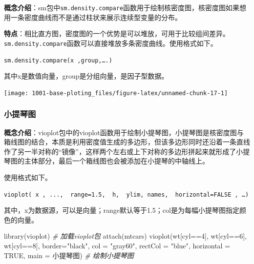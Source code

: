 \documentclass[
]{book}
\newenvironment{Shaded}{\begin{snugshade}}{\end{snugshade}}
\newcommand{\AttributeTok}[1]{\textcolor[rgb]{0.77,0.63,0.00}{#1}}
\newcommand{\CommentTok}[1]{\textcolor[rgb]{0.56,0.35,0.01}{\textit{#1}}}
\newcommand{\ConstantTok}[1]{\textcolor[rgb]{0.00,0.00,0.00}{#1}}
\newcommand{\DecValTok}[1]{\textcolor[rgb]{0.00,0.00,0.81}{#1}}
\newcommand{\FunctionTok}[1]{\textcolor[rgb]{0.00,0.00,0.00}{#1}}
\newcommand{\NormalTok}[1]{#1}
\newcommand{\SpecialCharTok}[1]{\textcolor[rgb]{0.00,0.00,0.00}{#1}}
\newcommand{\StringTok}[1]{\textcolor[rgb]{0.31,0.60,0.02}{#1}}
\begin{document}
\textbf{概念介绍}：sm包中\texttt{sm.density.compare}函数用于绘制核密度图，核密度图如果想用一条密度曲线而不是通过柱状来展示连续型变量的分布。

\textbf{特点}：相比直方图，密度图的一个优势是可以堆放，可用于比较组间差异。\texttt{sm.density.compare}函数可以直接堆放多条密度曲线。使用格式如下。

\texttt{sm.density.compare(x\ ,group,….)}

其中x是数值向量，group是分组向量，是因子型数据。

\begin{Shaded}
\end{Shaded}

\begin{center}\texttt{[image: 1001-base-ploting\_files/figure-latex/unnamed-chunk-17-1]} \end{center}

\hypertarget{ux5c0fux63d0ux7434ux56fe}{%
\subsubsection{小提琴图}\label{ux5c0fux63d0ux7434ux56fe}}

\textbf{概念介绍}：vioplot包中的vioplot函数用于绘制小提琴图，小提琴图是核密度图与箱线图的结合，本质是利用密度值生成的多边形，但该多边形同时还沿着一条直线作了另一半对称的``镜像''，这样两个左右或上下对称的多边形拼起来就形成了小提琴图的主体部分，最后一个箱线图也会被添加在小提琴的中轴线上。

使用格式如下。

\texttt{vioplot(\ x\ ,\ ...,\ \ range=1.5,\ \ h,\ \ ylim,\ names,\ \ horizontal=FALSE\ ,\ …)}

其中，x为数据源，可以是向量；range默认等于1.5；col是为每幅小提琴图指定颜色的向量。

\begin{Shaded}
\begin{Highlighting}[]
\FunctionTok{library}\NormalTok{(vioplot)      }\CommentTok{\# 加载vioplot包}
\FunctionTok{attach}\NormalTok{(mtcars)}
\FunctionTok{vioplot}\NormalTok{(wt[cyl}\SpecialCharTok{==}\DecValTok{4}\NormalTok{], wt[cyl}\SpecialCharTok{==}\DecValTok{6}\NormalTok{], wt[cyl}\SpecialCharTok{==}\DecValTok{8}\NormalTok{],  }\AttributeTok{border=}\StringTok{"black"}\NormalTok{, }
        \AttributeTok{col =} \StringTok{"gray60"}\NormalTok{, }\AttributeTok{rectCol =} \StringTok{"blue"}\NormalTok{, }\AttributeTok{horizontal =} \ConstantTok{TRUE}\NormalTok{,}
        \AttributeTok{main =} \StringTok{\textquotesingle{}小提琴图\textquotesingle{}}\NormalTok{)  }\CommentTok{\# 绘制小提琴图}
\end{Highlighting}
\end{Shaded}
\end{document}
